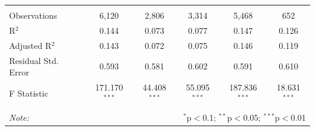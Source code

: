 \documentclass[12pt,a4paper]{article}
\begin{document}
\begin{Schunk}
\begin{table}[!htbp]
\begin{tabular}{@{\extracolsep{5pt}}lccccc}
  & & & & & \\ 
\hline \\[-1.8ex] 
Observations & 6,120 & 2,806 & 3,314 & 5,468 & 652 \\ 
R$^{2}$ & 0.144 & 0.073 & 0.077 & 0.147 & 0.126 \\ 
Adjusted R$^{2}$ & 0.143 & 0.072 & 0.075 & 0.146 & 0.119 \\ 
Residual Std. Error & 0.593 & 0.581 & 0.602 & 0.591 & 0.610 \\ 
F Statistic & 171.170$^{***}$ & 44.408$^{***}$ & 55.095$^{***}$ & 187.836$^{***}$ & 18.631$^{***}$ \\ 
\hline 
\hline \\[-1.8ex] 
\textit{Note:}  & \multicolumn{5}{r}{$^{*}$p$<$0.1; $^{**}$p$<$0.05; $^{***}$p$<$0.01} \\ 
\end{tabular} 
\end{table} 

\newpage\end{Schunk}
\end{document}
